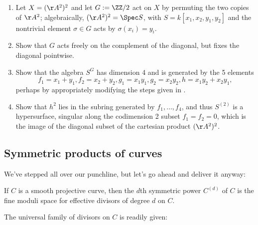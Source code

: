 \begin{exercise}
 \label{sym2A2} 
 \begin{enumerate}
 \item Let $X = (\AA^{2})^{2}$ and let $G := \ZZ/2$ act on $X$ by permuting the two copies of  $\AA^{2}$; algebraically,
$(\AA^{2})^{2} = \Spec S$, with $S = k[x_{1},x_{2}, y_{1}, y_{2}]$ and the nontrivial element $\sigma\in G$ acts by
$\sigma(x_{i}) = y_{i}$. 
\item Show that $G$ acts freely on the complement of the diagonal, but fixes the diagonal pointwise.
\item Show that the algebra $S^{G}$ has dimension 4 and is generated by the 5 elements
$$ 
f_{1} = x_{1}+y_{1}, f_{2} = x_{2}+y_{2}, g_{1} = x_{1}y_{1}, g_{2} = x_{2}y_{2}, h = x_{1}y_{2}+x_{2}y_{1},
$$
perhaps by appropriately modifying the steps given in \cite[Exercise 1.6]{E}. 
\item Show that $h^2$ lies in the subring generated by $f_1,\dots, f_4$, and thus $S^{(2)}$ is a hypersurface, singular
along the  codimension 2 subset $f_{1} = f_{2} = 0$, which is the image of the diagonal subset of the 
cartesian product $(\AA^{2})^{2}$.
\end{enumerate}
\end{exercise}



\subsection{Symmetric products of curves}

We've stepped all over our punchline, but let's go ahead and deliver it anyway:
\begin{fact}
If $C$ is a smooth projective curve, then the $d$th symmetric power $C^{(d)}$ of $C$ is the fine moduli space for effective divisors of degree $d$ on $C$.
\end{fact}

The universal family of divisors on $C$ is readily given:

%
%
 
